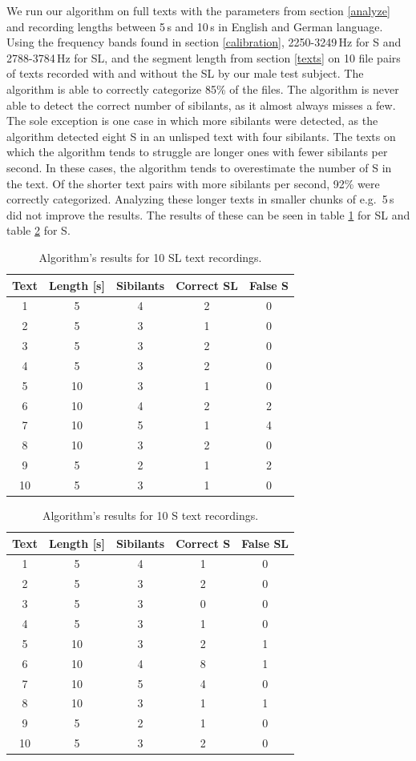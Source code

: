 \documentclass{IEEEtran}
\begin{document}
We run our algorithm on full texts with the parameters from section \ref{analyze} and recording lengths between 5\,s and 10\,s in English and German language.
Using the frequency bands found in section \ref{calibration}, 2250-3249\,Hz for S and 2788-3784\,Hz for SL, and the segment length from section \ref{texts} on 10 file pairs of texts recorded with and without the SL by our male test subject.
The algorithm is able to correctly categorize 85\% of the files.
The algorithm is never able to detect the correct number of sibilants,
as it almost always misses a few.
The sole exception is one case in which more sibilants were detected,
as the algorithm detected eight S in an unlisped text with four sibilants.
The texts on which the algorithm tends to struggle are longer ones with fewer sibilants per second.
In these cases,
the algorithm tends to overestimate the number of S in the text.
Of the shorter text pairs with more sibilants per second,
92\% were correctly categorized.
Analyzing these longer texts in smaller chunks of e.g.\ 5\,s did not improve the results.
The results of these can be seen in table \ref{resultstablesl} for SL and table \ref{resultstables} for S.

\begin{table}[h]
\centering
\caption{Algorithm's results for 10 SL text recordings.}\label{resultstablesl}
\begin{tabular}{ccccc}
Text & Length [s] & Sibilants & Correct SL & False S \\
\hline
1 & 5 & 4 & 2 & 0 \\
2 & 5 & 3 & 1 & 0 \\
3 & 5 & 3 & 2 & 0 \\
4 & 5 & 3 & 2 & 0 \\
5 & 10 & 3 & 1 & 0 \\
6 & 10 & 4 & 2 & 2 \\
7 & 10 & 5 & 1 & 4 \\
8 & 10 & 3 & 2 & 0 \\
9 & 5 & 2 & 1 & 2 \\
10 & 5 & 3 & 1 & 0
\end{tabular}

\end{table}
\begin{table}[h]
\centering
\caption{Algorithm's results for 10 S text recordings.}\label{resultstables}
\begin{tabular}{ccccc}
Text & Length [s] & Sibilants & Correct S & False SL \\
\hline
1 & 5 & 4 & 1 & 0 \\
2 & 5 & 3 & 2 & 0 \\
3 & 5 & 3 & 0 & 0 \\
4 & 5 & 3 & 1 & 0 \\
5 & 10 & 3 & 2 & 1 \\
6 & 10 & 4 & 8 & 1 \\
7 & 10 & 5 & 4 & 0 \\
8 & 10 & 3 & 1 & 1 \\
9 & 5 & 2 & 1 & 0 \\
10 & 5 & 3 & 2 & 0
\end{tabular}
\end{table}
\end{document}
